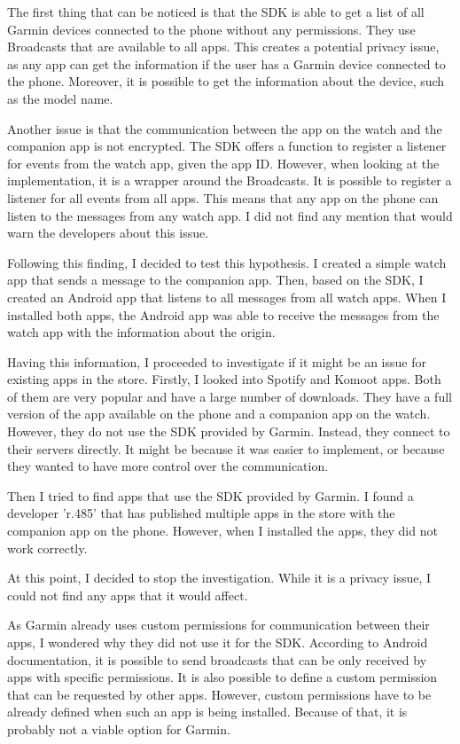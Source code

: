 The first thing that can be noticed is that the SDK is able to get a list of all Garmin devices connected to the phone without any permissions.
They use Broadcasts that are available to all apps.
This creates a potential privacy issue, as any app can get the information if the user has a Garmin device connected to the phone.
Moreover, it is possible to get the information about the device, such as the model name.

Another issue is that the communication between the app on the watch and the companion app is not encrypted.
The SDK offers a function to register a listener for events from the watch app, given the app ID\@.
However, when looking at the implementation, it is a wrapper around the Broadcasts.
It is possible to register a listener for all events from all apps.
This means that any app on the phone can listen to the messages from any watch app.
I did not find any mention that would warn the developers about this issue.

Following this finding, I decided to test this hypothesis.
I created a simple watch app that sends a message to the companion app.
Then, based on the SDK, I created an Android app that listens to all messages from all watch apps.
When I installed both apps, the Android app was able to receive the messages from the watch app with the information about the origin.

Having this information, I proceeded to investigate if it might be an issue for existing apps in the store.
Firstly, I looked into Spotify and Komoot apps.
Both of them are very popular and have a large number of downloads.
They have a full version of the app available on the phone and a companion app on the watch.
However, they do not use the SDK provided by Garmin.
Instead, they connect to their servers directly.
It might be because it was easier to implement, or because they wanted to have more control over the communication.

Then I tried to find apps that use the SDK provided by Garmin.
I found a developer 'r.485' that has published multiple apps in the store with the companion app on the phone.
However, when I installed the apps, they did not work correctly.

At this point, I decided to stop the investigation.
While it is a privacy issue, I could not find any apps that it would affect.


As Garmin already uses custom permissions for communication between their apps, I wondered why they did not use it for the SDK\@.
According to Android documentation,\cite{android-broadcasts} it is possible to send broadcasts that can be only received by apps with specific permissions.
It is also possible to define a custom permission that can be requested by other apps.
However, custom permissions have to be already defined when such an app is being installed.
Because of that, it is probably not a viable option for Garmin.
